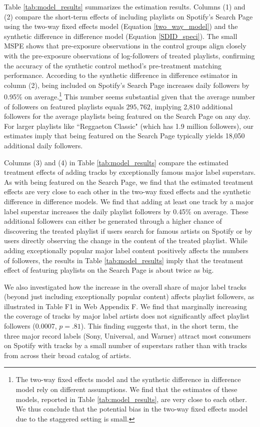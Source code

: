 \documentclass[12pt, a4paper, leqno]{article}
\begin{document}
Table \ref{tab:model_results} summarizes the estimation results. Columns (1) and (2) compare the short-term effects of including playlists on Spotify's Search Page using the two-way fixed effects model (Equation \ref{two_way_model}) and the synthetic difference in difference model (Equation \ref{SDID_speci}).  
The small MSPE shows that pre-exposure observations in the control groups align closely with the pre-exposure observations of log-followers of treated playlists, confirming the accuracy of the synthetic control method's pre-treatment matching performance. 
According to the synthetic difference in difference estimator in column (2), being included on Spotify's Search Page increases daily followers by 0.95\% on average.\footnote{The two-way fixed effects model and the synthetic difference in difference model rely on different assumptions. We find that the estimates of these models, reported in Table \ref{tab:model_results}, are very close to each other. We thus conclude that the potential bias in the two-way fixed effects model due to the staggered setting is small.} This number seems substantial given that the average number of followers on featured playlists equals $295,762$, implying 2,810 additional followers for the average playlists being featured on the Search Page on any day. 
For larger playlists like ``Reggaeton Classic" (which has 1.9 million followers), our estimates imply that being featured on the Search Page typically yields 18,050 additional daily followers. 

Columns (3) and (4) in Table \ref{tab:model_results} compare the estimated treatment effects of adding tracks by exceptionally famous major label superstars. As with  being featured 
on the Search Page, we find that the estimated treatment effects are very close to each other in the two-way fixed effects and the synthetic difference in difference models. We find that adding at least one track by a major label superstar increases the daily playlist followers by 0.45\% on average. These additional followers can either be generated through a higher chance of discovering the treated playlist if users search for famous artists on Spotify or by users directly observing the change in the content of the treated playlist. While adding exceptionally popular major label content positively affects the numbers of followers, the results in Table \ref{tab:model_results} imply that the treatment effect of featuring playlists on the Search Page is about twice as big.

We also investigated how the increase in the overall share of major label tracks (beyond just including exceptionally popular content) affects playlist followers, as illustrated in Table F1 in Web Appendix F. We find that marginally increasing the coverage of tracks by major label artists does not significantly affect playlist followers ($0.0007$, $p=.81$). This finding suggests that, in the short term, the three major record labels (Sony, Universal, and Warner) attract most consumers on Spotify with tracks by a small number of superstars rather than with tracks from across their broad catalog of artists. 
\end{document}
